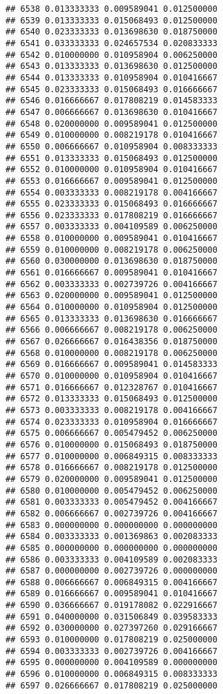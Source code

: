 \documentclass[
]{article}
\begin{document}
\begin{verbatim}
## 6538 0.013333333 0.009589041 0.012500000
## 6539 0.013333333 0.015068493 0.012500000
## 6540 0.023333333 0.013698630 0.018750000
## 6541 0.033333333 0.024657534 0.020833333
## 6542 0.010000000 0.010958904 0.006250000
## 6543 0.013333333 0.013698630 0.012500000
## 6544 0.013333333 0.010958904 0.010416667
## 6545 0.023333333 0.015068493 0.016666667
## 6546 0.016666667 0.017808219 0.014583333
## 6547 0.006666667 0.013698630 0.010416667
## 6548 0.020000000 0.009589041 0.012500000
## 6549 0.010000000 0.008219178 0.010416667
## 6550 0.006666667 0.010958904 0.008333333
## 6551 0.013333333 0.015068493 0.012500000
## 6552 0.010000000 0.010958904 0.010416667
## 6553 0.016666667 0.009589041 0.012500000
## 6554 0.003333333 0.008219178 0.004166667
## 6555 0.023333333 0.015068493 0.016666667
## 6556 0.023333333 0.017808219 0.016666667
## 6557 0.003333333 0.004109589 0.006250000
## 6558 0.010000000 0.009589041 0.010416667
## 6559 0.010000000 0.008219178 0.006250000
## 6560 0.030000000 0.013698630 0.018750000
## 6561 0.016666667 0.009589041 0.010416667
## 6562 0.003333333 0.002739726 0.004166667
## 6563 0.020000000 0.009589041 0.012500000
## 6564 0.010000000 0.010958904 0.012500000
## 6565 0.013333333 0.013698630 0.016666667
## 6566 0.006666667 0.008219178 0.006250000
## 6567 0.026666667 0.016438356 0.018750000
## 6568 0.010000000 0.008219178 0.006250000
## 6569 0.016666667 0.009589041 0.014583333
## 6570 0.010000000 0.010958904 0.010416667
## 6571 0.016666667 0.012328767 0.010416667
## 6572 0.013333333 0.015068493 0.012500000
## 6573 0.003333333 0.008219178 0.004166667
## 6574 0.023333333 0.010958904 0.016666667
## 6575 0.006666667 0.005479452 0.006250000
## 6576 0.010000000 0.015068493 0.018750000
## 6577 0.010000000 0.006849315 0.008333333
## 6578 0.016666667 0.008219178 0.012500000
## 6579 0.020000000 0.009589041 0.012500000
## 6580 0.010000000 0.005479452 0.006250000
## 6581 0.003333333 0.005479452 0.004166667
## 6582 0.006666667 0.002739726 0.004166667
## 6583 0.000000000 0.000000000 0.000000000
## 6584 0.003333333 0.001369863 0.002083333
## 6585 0.000000000 0.000000000 0.000000000
## 6586 0.003333333 0.004109589 0.002083333
## 6587 0.000000000 0.002739726 0.000000000
## 6588 0.006666667 0.006849315 0.004166667
## 6589 0.016666667 0.009589041 0.010416667
## 6590 0.036666667 0.019178082 0.022916667
## 6591 0.040000000 0.031506849 0.039583333
## 6592 0.030000000 0.027397260 0.029166667
## 6593 0.010000000 0.017808219 0.025000000
## 6594 0.003333333 0.002739726 0.004166667
## 6595 0.000000000 0.004109589 0.000000000
## 6596 0.010000000 0.006849315 0.008333333
## 6597 0.026666667 0.017808219 0.025000000

\end{verbatim}
\end{document}

